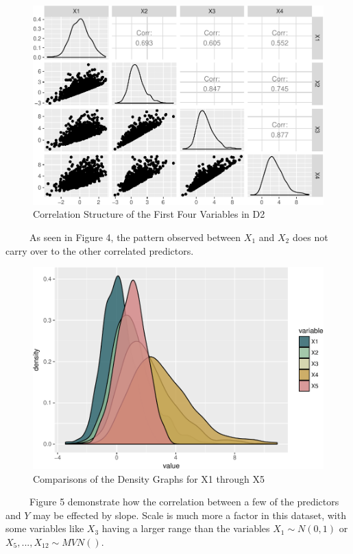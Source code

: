 \documentclass[12pt,twoside]{reedthesis}
\begin{document}
  \begin{figure}[htbp]
  \centering
  \includegraphics{Thesis_files/figure-latex/compsD2-1.pdf}
  \caption{\label{fig:compsD2}Correlation Structure of the First Four
  Variables in D2}
  \end{figure}
  
  ~~~~~As seen in Figure 4, the pattern observed between \(X_1\) and
  \(X_2\) does not carry over to the other correlated predictors.
  
  \begin{figure}[htbp]
  \centering
  \includegraphics{Thesis_files/figure-latex/densityD2-1.pdf}
  \caption{\label{fig:densityD2}Comparisons of the Density Graphs for X1
  through X5}
  \end{figure}
  
  ~~~~~Figure 5 demonstrate how the correlation between a few of the
  predictors and \(Y\) may be effected by slope. Scale is much more a
  factor in this dataset, with some variables like \(X_3\) having a larger
  range than the variables \(X_1 \sim N(0,1)\) or
  \(X_5,...,X_{12} \sim MVN()\).
  
\end{document}
